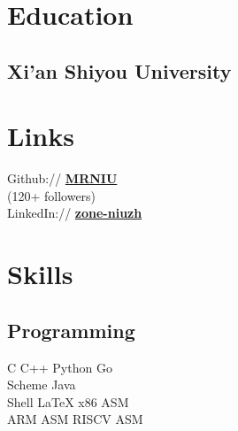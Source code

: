 \documentclass[]{deedy-resume-openfont}
\begin{document}
%
%
\lastupdated

%
%

%
%

\begin{minipage}[t]{0.25\textwidth} 


\section{Education} 

\subsection{Xi'an Shiyou University}
\sectionsep


\section{Links}
Github:// \href{https://github.com/MRNIU}{\bf MRNIU} \\
(120+ followers) \\
LinkedIn://  \href{https://www.linkedin.com/in/zone-niuzh}{\bf zone-niuzh} \\
\sectionsep



\section{Skills}
\subsection{Programming}
C \textbullet{} C++ \textbullet{} Python \textbullet{} Go \\
Scheme \textbullet{} Java \\
Shell \textbullet{} \LaTeX \textbullet{} x86 ASM \\
ARM ASM \textbullet{} RISCV ASM \\
\sectionsep


\end{minipage}
\end{document}
